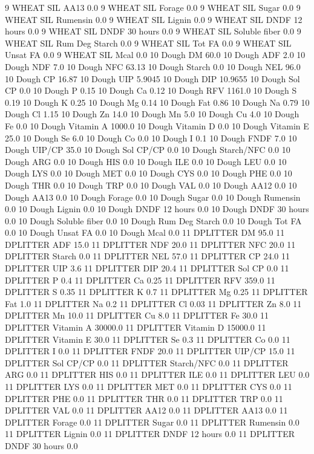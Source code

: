 \documentclass[letterpaper,10pt,english]{sphinxmanual}
\begin{document}
\begin{sphinxVerbatim}[commandchars=\\\{\},numbers=left,firstnumber=1,stepnumber=1]
9 WHEAT SIL AA\PYGZsh{}13 0.0
9 WHEAT SIL \PYGZpc{} Forage 0.0
9 WHEAT SIL Sugar \PYGZpc{} 0.0
9 WHEAT SIL Rumensin 0.0
9 WHEAT SIL Lignin 0.0
9 WHEAT SIL DNDF 12 hours 0.0
9 WHEAT SIL DNDF 30 hours 0.0
9 WHEAT SIL Soluble fiber 0.0
9 WHEAT SIL Rum Deg Starch 0.0
9 WHEAT SIL Tot FA 0.0
9 WHEAT SIL Unsat FA 0.0
9 WHEAT SIL Mcal 0.0
10 Dough DM 60.0
10 Dough ADF 2.0
10 Dough NDF 7.0
10 Dough NFC 63.13
10 Dough Starch 0.0
10 Dough NEL 96.0
10 Dough CP 16.87
10 Dough UIP 5.9045
10 Dough DIP 10.9655
10 Dough Sol CP 0.0
10 Dough P 0.15
10 Dough Ca 0.12
10 Dough RFV 1161.0
10 Dough S 0.19
10 Dough K 0.25
10 Dough Mg 0.14
10 Dough Fat 0.86
10 Dough Na 0.79
10 Dough Cl 1.15
10 Dough Zn 14.0
10 Dough Mn 5.0
10 Dough Cu 4.0
10 Dough Fe 0.0
10 Dough Vitamin A 1000.0
10 Dough Vitamin D 0.0
10 Dough Vitamin E 25.0
10 Dough Se 6.0
10 Dough Co 0.0
10 Dough I 0.1
10 Dough FNDF 7.0
10 Dough UIP/CP 35.0
10 Dough Sol CP/CP 0.0
10 Dough Starch/NFC 0.0
10 Dough ARG 0.0
10 Dough HIS 0.0
10 Dough ILE 0.0
10 Dough LEU 0.0
10 Dough LYS 0.0
10 Dough MET 0.0
10 Dough CYS 0.0
10 Dough PHE 0.0
10 Dough THR 0.0
10 Dough TRP 0.0
10 Dough VAL 0.0
10 Dough AA\PYGZsh{}12 0.0
10 Dough AA\PYGZsh{}13 0.0
10 Dough \PYGZpc{} Forage 0.0
10 Dough Sugar \PYGZpc{} 0.0
10 Dough Rumensin 0.0
10 Dough Lignin 0.0
10 Dough DNDF 12 hours 0.0
10 Dough DNDF 30 hours 0.0
10 Dough Soluble fiber 0.0
10 Dough Rum Deg Starch 0.0
10 Dough Tot FA 0.0
10 Dough Unsat FA 0.0
10 Dough Mcal 0.0
11 DPLITTER DM 95.0
11 DPLITTER ADF 15.0
11 DPLITTER NDF 20.0
11 DPLITTER NFC 20.0
11 DPLITTER Starch 0.0
11 DPLITTER NEL 57.0
11 DPLITTER CP 24.0
11 DPLITTER UIP 3.6
11 DPLITTER DIP 20.4
11 DPLITTER Sol CP 0.0
11 DPLITTER P 0.4
11 DPLITTER Ca 0.25
11 DPLITTER RFV 359.0
11 DPLITTER S 0.35
11 DPLITTER K 0.7
11 DPLITTER Mg 0.25
11 DPLITTER Fat 1.0
11 DPLITTER Na 0.2
11 DPLITTER Cl 0.03
11 DPLITTER Zn 8.0
11 DPLITTER Mn 10.0
11 DPLITTER Cu 8.0
11 DPLITTER Fe 30.0
11 DPLITTER Vitamin A 30000.0
11 DPLITTER Vitamin D 15000.0
11 DPLITTER Vitamin E 30.0
11 DPLITTER Se 0.3
11 DPLITTER Co 0.0
11 DPLITTER I 0.0
11 DPLITTER FNDF 20.0
11 DPLITTER UIP/CP 15.0
11 DPLITTER Sol CP/CP 0.0
11 DPLITTER Starch/NFC 0.0
11 DPLITTER ARG 0.0
11 DPLITTER HIS 0.0
11 DPLITTER ILE 0.0
11 DPLITTER LEU 0.0
11 DPLITTER LYS 0.0
11 DPLITTER MET 0.0
11 DPLITTER CYS 0.0
11 DPLITTER PHE 0.0
11 DPLITTER THR 0.0
11 DPLITTER TRP 0.0
11 DPLITTER VAL 0.0
11 DPLITTER AA\PYGZsh{}12 0.0
11 DPLITTER AA\PYGZsh{}13 0.0
11 DPLITTER \PYGZpc{} Forage 0.0
11 DPLITTER Sugar \PYGZpc{} 0.0
11 DPLITTER Rumensin 0.0
11 DPLITTER Lignin 0.0
11 DPLITTER DNDF 12 hours 0.0
11 DPLITTER DNDF 30 hours 0.0

\end{sphinxVerbatim}
\end{document}
